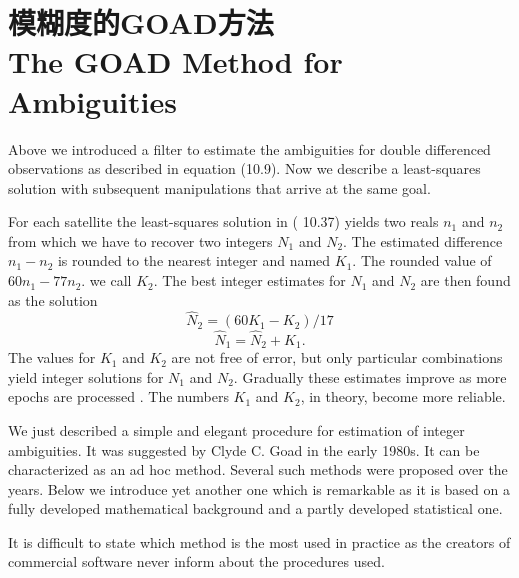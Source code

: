 \section[模糊度的GOAD解法]{模糊度的GOAD方法\\The GOAD Method for Ambiguities}
Above we introduced a filter to estimate the ambiguities for double differenced observations as described in equation (10.9). Now we describe a least-squares solution with subsequent manipulations that arrive at the same goal.

For each satellite the least-squares solution in ( 10.37) yields two reals $n_{1}$ and $n_{2}$ from which we have to recover two integers $N_{1}$ and $N_{2}$. The estimated difference $n_{1}-n_{2}$ is rounded to the nearest integer and named $K_{1}$. The rounded value of $60n_{1}-77n_{2}$. we call $K_{2}$. The best integer estimates for $N_{1}$ and $N_{2}$ are then found as the solution
\begin{equation}
\hat{N}_{2}=(60K_{1}-K_{2})/17
\end{equation}
\begin{equation}
\hat{N}_{1}=\hat{N}_{2}+K_{1}.
\end{equation}
The values for $K_{1}$ and $K_{2}$ are not free of error, but only particular combinations yield integer solutions for $N_{1}$ and $N_{2}$. Gradually these estimates improve as more epochs are processed . The numbers $K_{1}$ and $K_{2}$, in theory, become more reliable.

We just described a simple and elegant procedure for estimation of integer ambiguities. It was suggested by Clyde C. Goad in the early 1980s. It can be characterized as an ad hoc method. Several such methods were proposed over the years. Below we introduce yet another one which is remarkable as it is based on a fully developed mathematical background and a partly developed statistical one.

It is difficult to state which method is the most used in practice as the creators of
commercial software never inform about the procedures used.